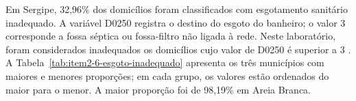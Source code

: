Em Sergipe, 32,96\% dos domicílios foram classificados com esgotamento sanitário inadequado. A variável D0250 registra o destino do esgoto do banheiro; o valor 3 corresponde a fossa séptica ou fossa-filtro não ligada à rede. Neste laboratório, foram considerados inadequados os domicílios cujo valor de D0250 é superior a 3 \cite{ibgedicmicrodados2022}. A Tabela~\ref{tab:item2-6-esgoto-inadequado} apresenta os três municípios com maiores e menores proporções; em cada grupo, os valores estão ordenados do maior para o menor. A maior proporção foi de 98,19\% em Areia Branca.
